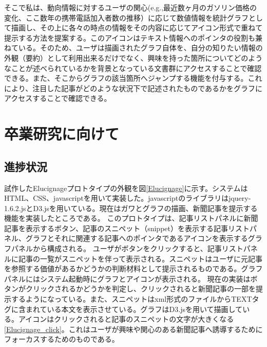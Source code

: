 \documentclass{matsushita-zemi}
\begin{document}
そこで私は、動向情報に対するユーザの関心(e.g.,最近数ヶ月のガソリン価格の変化、ここ数年の携帯電話加入者数の推移）に応じて数値情報を統計グラフとして描画し、その上に各々の時点の情報をその内容に応じてアイコン形式で重ねて提示する方法を提案する。このアイコンはテキスト情報へのポインタの役割も兼ねている。そのため、ユーザは描画されたグラフ自体を、自分の知りたい情報の外観（要約）として利用出来るだけでなく、興味を持った箇所についてどのようなことが述べられているかを背景となっている文書群にアクセスすることで確認できる。また、そこからグラフの該当箇所へジャンプする機能を付与する。これにより、注目した記事がどのような状況下で記述されたものであるかをグラフにアクセスすることで確認できる。\cite{Elucignage}

\section{卒業研究に向けて}

\subsection{進捗状況}
試作したElucignageプロトタイプの外観を図\ref{Elucignage}に示す。システムはHTML、CSS、javascriptを用いて実装した。javascriptのライブラリはjquery-1.6.2.jsとD3.jsを用いている。現在はガワとグラフの描画、新聞記事を提示する機能を実装したところである。
このプロトタイプは、記事リストパネルに新聞記事を表示するボタン、記事のスニペット（snippet）を表示する記事リストパネル、グラフとそれに関連する記事へのポインタであるアイコンを表示するグラフパネルから構成される。
ユーザがボタンをクリックすると、記事リストパネルに記事の一覧がスニペットを伴って表示される。スニペットはユーザに元記事を参照する価値があるかどうかの判断材料として提示されるものである。グラフパネルにはシステム起動時にグラフとアイコンが表示される。
現在の実装はボタンがクリックされるかどうかを判定し、クリックされると新聞記事の一部を提示するようになっている。また、スニペットはxml形式のファイルからTEXTタグに含まれている本文を表示させている。グラフはD3.jsを用いて描画している。アイコンはクリックされると記事のスニペットの文字が大きくなる\ref{Elucignage_click}。これはユーザが興味や関心のある新聞記事へ誘導するためにフォーカスするためのものである。
\end{document}
